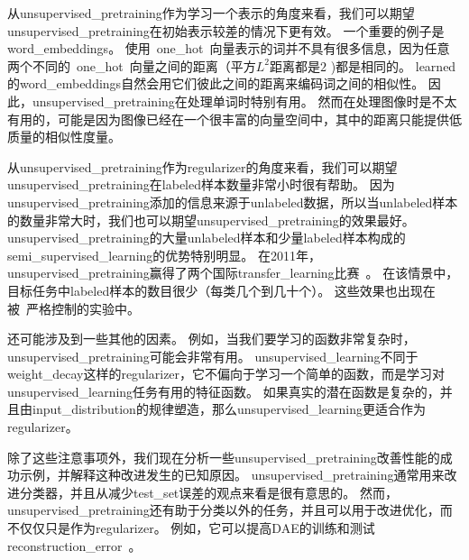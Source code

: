
从\gls{unsupervised_pretraining}作为学习一个表示的角度来看，我们可以期望\gls{unsupervised_pretraining}在初始表示较差的情况下更有效。
一个重要的例子是\gls{word_embeddings}。
使用~\gls{one_hot}~向量表示的词并不具有很多信息，因为任意两个不同的~\gls{one_hot}~向量之间的距离（平方$L^2$距离都是$2$ )都是相同的。
\gls{learned}的\gls{word_embeddings}自然会用它们彼此之间的距离来编码词之间的相似性。
因此，\gls{unsupervised_pretraining}在处理单词时特别有用。
然而在处理图像时是不太有用的，可能是因为图像已经在一个很丰富的向量空间中，其中的距离只能提供低质量的相似性度量。


从\gls{unsupervised_pretraining}作为\gls{regularizer}的角度来看，我们可以期望\gls{unsupervised_pretraining}在\gls{labeled}样本数量非常小时很有帮助。
因为\gls{unsupervised_pretraining}添加的信息来源于\gls{unlabeled}数据，所以当\gls{unlabeled}样本的数量非常大时，我们也可以期望\gls{unsupervised_pretraining}的效果最好。
\gls{unsupervised_pretraining}的大量\gls{unlabeled}样本和少量\gls{labeled}样本构成的\gls{semi_supervised_learning}的优势特别明显。
在2011年，\gls{unsupervised_pretraining}赢得了两个国际\gls{transfer_learning}比赛~\citep{UTLC+LISA-2011-small,goodfellow+all-NIPS2011}。
在该情景中，目标任务中\gls{labeled}样本的数目很少（每类几个到几十个）。
这些效果也出现在被~\citet{paine2014analysis}严格控制的实验中。


还可能涉及到一些其他的因素。
例如，当我们要学习的函数非常复杂时，\gls{unsupervised_pretraining}可能会非常有用。
\gls{unsupervised_learning}不同于\gls{weight_decay}这样的\gls{regularizer}，它不偏向于学习一个简单的函数，而是学习对\gls{unsupervised_learning}任务有用的特征函数。
如果真实的潜在函数是复杂的，并且由\gls{input_distribution}的规律塑造，那么\gls{unsupervised_learning}更适合作为\gls{regularizer}。


除了这些注意事项外，我们现在分析一些\gls{unsupervised_pretraining}改善性能的成功示例，并解释这种改进发生的已知原因。
\gls{unsupervised_pretraining}通常用来改进分类器，并且从减少\gls{test_set}误差的观点来看是很有意思的。
然而，\gls{unsupervised_pretraining}还有助于分类以外的任务，并且可以用于改进优化，而不仅仅只是作为\gls{regularizer}。
例如，它可以提高\gls{DAE}的训练和测试\gls{reconstruction_error}~\citep{Hinton-Science2006}。


